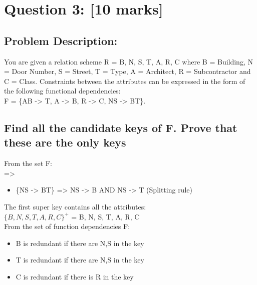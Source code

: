 \newpage
\section{Question 3: [10 marks]}
\subsection{Problem Description:}
You are given a relation scheme R = {B, N, S, T, A, R, C} where B = Building, N = Door
Number, S = Street, T = Type, A = Architect, R = Subcontractor and C = Class.
Constraints between the attributes can be expressed in the form of the following
functional dependencies: \\
F = \{AB -> T, A -> B, R -> C, NS -> BT\}.

\newpage
\subsection{Find all the candidate keys of F. Prove that these are the only keys}
From the set F: \\
=>
\begin{itemize}
    \item \{NS -> BT\} => NS -> B AND NS -> T (Splitting rule)
\end{itemize}

The first super key contains all the attributes: \\
$\{B, N, S, T, A, R, C\}^{+}$ = {B, N, S, T, A, R, C}
\\

From the set of function dependencies F:
\begin{itemize}
    \item B is redundant if there are N,S in the key
    \item T is redundant if there are N,S in the key
    \item C is redundant if there is R in the key
\end{itemize}

